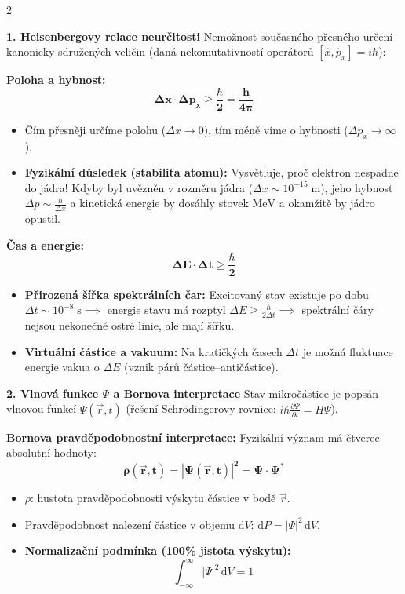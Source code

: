 \documentclass[9pt,a4paper]{article}
\begin{document}
\begin{tcolorbox}[secbox,title=5. KVANTOVÁ MECHANIKA, HEISENBERGOVY RELACE NEURČITOSTI A ATOMOVÉ ORBITALY]
\begin{multicols}{2}

\textbf{\large 1. Heisenbergovy relace neurčitosti}
Nemožnost současného přesného určení kanonicky sdružených veličin (daná nekomutativností operátorů $[\hat{x}, \hat{p}_x] = i\hbar$):

\textbf{Poloha a hybnost:}
\[\mathbf{\Delta x \cdot \Delta p_x \ge \frac{\hbar}{2} = \frac{h}{4\pi}}\]
\begin{itemize}
  \item Čím přesněji určíme polohu ($\Delta x \to 0$), tím méně víme o hybnosti ($\Delta p_x \to \infty$).
  \item \textbf{Fyzikální důsledek (stabilita atomu):} Vysvětluje, proč elektron nespadne do jádra! Kdyby byl uvězněn v rozměru jádra ($\Delta x \sim 10^{-15}\;\text{m}$), jeho hybnost $\Delta p \sim \frac{\hbar}{\Delta x}$ a kinetická energie by dosáhly stovek $\text{MeV}$ a okamžitě by jádro opustil.
\end{itemize}

\textbf{Čas a energie:}
\[\mathbf{\Delta E \cdot \Delta t \ge \frac{\hbar}{2}}\]
\begin{itemize}
  \item \textbf{Přirozená šířka spektrálních čar:} Excitovaný stav existuje po dobu $\Delta t \sim 10^{-8}\;\text{s} \implies$ energie stavu má rozptyl $\Delta E \ge \frac{\hbar}{2\Delta t} \implies$ spektrální čáry nejsou nekonečně ostré linie, ale mají šířku.
  \item \textbf{Virtuální částice a vakuum:} Na kratičkých časech $\Delta t$ je možná fluktuace energie vakua o $\Delta E$ (vznik párů částice--antičástice).
\end{itemize}

\vspace{1mm}
\textbf{\large 2. Vlnová funkce $\Psi$ a Bornova interpretace}
Stav mikročástice je popsán vlnovou funkcí $\Psi(\vec{r}, t)$ (řešení Schrödingerovy rovnice: $i\hbar \frac{\partial \Psi}{\partial t} = \hat{H}\Psi$).

\textbf{Bornova pravděpodobnostní interpretace:}
Fyzikální význam má čtverec absolutní hodnoty:
\[\mathbf{\rho(\vec{r}, t) = |\Psi(\vec{r}, t)|^2 = \Psi \cdot \Psi^*}\]
\begin{itemize}
  \item $\rho$: hustota pravděpodobnosti výskytu částice v bodě $\vec{r}$.
  \item Pravděpodobnost nalezení částice v objemu $\mathrm{d}V$: $\mathrm{d}P = |\Psi|^2\,\mathrm{d}V$.
  \item \textbf{Normalizační podmínka (100\% jistota výskytu):}
  \[\int_{-\infty}^{\infty} |\Psi|^2\,\mathrm{d}V = 1\]
\end{itemize}


\end{multicols}
\end{tcolorbox}
\end{document}
